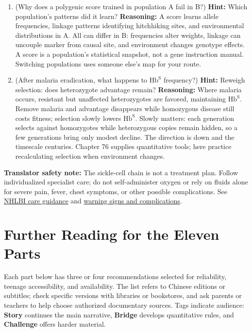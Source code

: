 \begin{enumerate}[itemsep=3pt]
\item (Why does a polygenic score trained in population A fail in B?) \textbf{Hint:} Which population's patterns did it learn? \textbf{Reasoning:} A score learns allele frequencies, linkage patterns identifying hitchhiking sites, and environmental distributions in A. All can differ in B: frequencies alter weights, linkage can uncouple marker from causal site, and environment changes genotype effects. A score is a population's statistical snapshot, not a gene instruction manual. Switching populations uses someone else's map for your route.
\item (After malaria eradication, what happens to $\mathrm{Hb^{S}}$ frequency?) \textbf{Hint:} Reweigh selection: does heterozygote advantage remain? \textbf{Reasoning:} Where malaria occurs, resistant but unaffected heterozygotes are favored, maintaining $\mathrm{Hb^{S}}$. Remove malaria and advantage disappears while homozygous disease still costs fitness; selection slowly lowers $\mathrm{Hb^{S}}$. Slowly matters: each generation selects against homozygotes while heterozygous copies remain hidden, so a few generations bring only modest decline. The direction is down and the timescale centuries. Chapter 76 supplies quantitative tools; here practice recalculating selection when environment changes.
\end{enumerate}

\textbf{Translator safety note:} The sickle-cell chain is not a treatment plan. Follow individualized specialist care; do not self-administer oxygen or rely on fluids alone for severe pain, fever, chest symptoms, or other possible complications. See \href{https://www.nhlbi.nih.gov/health/sickle-cell-disease/living-with}{NHLBI care guidance} and \href{https://www.nhlbi.nih.gov/health/sickle-cell-disease/health-effects}{warning signs and complications}.

\section{Further Reading for the Eleven Parts}

Each part below has three or four recommendations selected for reliability, teenage accessibility, and availability. The list refers to Chinese editions or subtitles; check specific versions with libraries or bookstores, and ask parents or teachers to help choose authorized documentary sources. Tags indicate audience: \textbf{Story} continues the main narrative, \textbf{Bridge} develops quantitative rules, and \textbf{Challenge} offers harder material.

